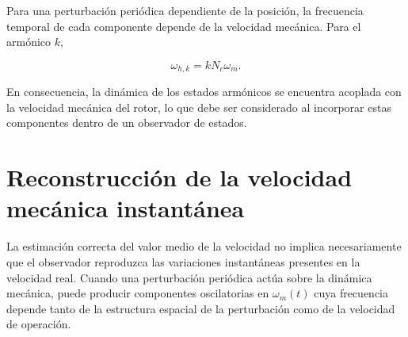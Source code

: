 %
%
%
%

Para una perturbación periódica dependiente de la posición, la frecuencia 
temporal de cada componente depende de la velocidad mecánica. Para el armónico 
$k$,

\begin{equation}
\omega_{h,k}
=
kN_c\omega_m.
\end{equation}

En consecuencia, la dinámica de los estados armónicos se encuentra acoplada 
con la velocidad mecánica del rotor, lo que debe ser considerado al incorporar 
estas componentes dentro de un observador de estados.



\section{Reconstrucción de la velocidad mecánica instantánea}

%
%
%
%

La estimación correcta del valor medio de la velocidad no implica 
necesariamente que el observador reproduzca las variaciones instantáneas 
presentes en la velocidad real. Cuando una perturbación periódica actúa sobre 
la dinámica mecánica, puede producir componentes oscilatorias en 
$\omega_m(t)$ cuya frecuencia depende tanto de la estructura espacial de la 
perturbación como de la velocidad de operación.

